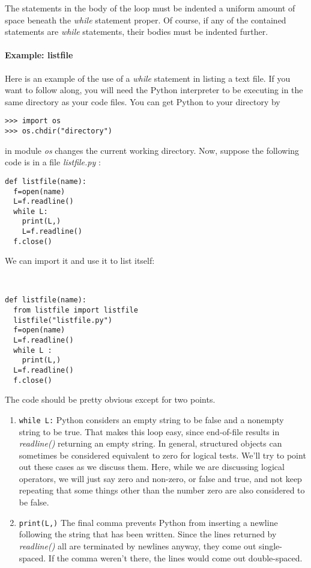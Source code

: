 The statements in the body of the
loop must be indented a uniform amount of space beneath the \emph{while}
statement proper. Of course, if any of the contained statements are
\emph{while} statements, their bodies must be indented further.

\paragraph{Example: listfile}
\label{example-listfile}

Here is an example of the use of a
\emph{while} statement in listing a text file. If you want to follow
along, you will need the Python interpreter to be executing in the same
directory as your code files. You can get Python to your directory by

\begin{verbatim}
>>> import os
>>> os.chdir("directory")
\end{verbatim}

 in
module \emph{os} changes the current working directory. Now, suppose the
following code is in a file \emph{listfile.py} :

\begin{verbatim}
def listfile(name):
  f=open(name)
  L=f.readline()
  while L:
    print(L,)
    L=f.readline()
  f.close()
\end{verbatim}

We can import it and use it to list
itself:


\begin{verbatim}


def listfile(name):
  from listfile import listfile
  listfile("listfile.py")
  f=open(name)
  L=f.readline()
  while L :
    print(L,)
  L=f.readline()
  f.close()
\end{verbatim}

The code should be pretty obvious
except for two points.

\begin{enumerate}

\item
  \texttt{while L:} Python considers an empty string to be false and a nonempty string to be
  true. That makes this loop easy, since end-of-file results in
  \emph{readline()} returning an empty string. In general, structured
  objects can sometimes be considered equivalent to zero for logical
  tests. We'll try to point out these cases as we discuss them. Here,
  while we are discussing logical operators, we will just say zero and
  non-zero, or false and true, and not keep repeating that some things
  other than the number zero are also considered to be false.
\item
  \texttt{print(L,)} The final comma
  prevents Python from inserting a newline following the string that has
  been written. Since the lines returned by \emph{readline()} all are
  terminated by newlines anyway, they come out single-spaced. If the
  comma weren't there, the lines would come out double-spaced.
\end{enumerate}

